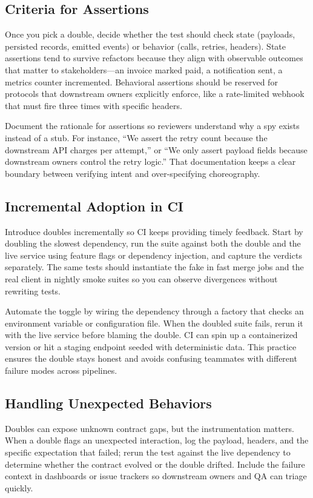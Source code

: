 \subsection{Criteria for Assertions}
Once you pick a double, decide whether the test should check state (payloads, persisted records, emitted events) or behavior (calls, retries, headers). State assertions tend to survive refactors because they align with observable outcomes that matter to stakeholders—an invoice marked paid, a notification sent, a metrics counter incremented. Behavioral assertions should be reserved for protocols that downstream owners explicitly enforce, like a rate-limited webhook that must fire three times with specific headers.

Document the rationale for assertions so reviewers understand why a spy exists instead of a stub. For instance, ``We assert the retry count because the downstream API charges per attempt,'' or ``We only assert payload fields because downstream owners control the retry logic.'' That documentation keeps a clear boundary between verifying intent and over-specifying choreography.

\subsection{Incremental Adoption in CI}
Introduce doubles incrementally so CI keeps providing timely feedback. Start by doubling the slowest dependency, run the suite against both the double and the live service using feature flags or dependency injection, and capture the verdicts separately. The same tests should instantiate the fake in fast merge jobs and the real client in nightly smoke suites so you can observe divergences without rewriting tests.

Automate the toggle by wiring the dependency through a factory that checks an environment variable or configuration file. When the doubled suite fails, rerun it with the live service before blaming the double. CI can spin up a containerized version or hit a staging endpoint seeded with deterministic data. This practice ensures the double stays honest and avoids confusing teammates with different failure modes across pipelines.

\subsection{Handling Unexpected Behaviors}
Doubles can expose unknown contract gaps, but the instrumentation matters. When a double flags an unexpected interaction, log the payload, headers, and the specific expectation that failed; rerun the test against the live dependency to determine whether the contract evolved or the double drifted. Include the failure context in dashboards or issue trackers so downstream owners and QA can triage quickly.

